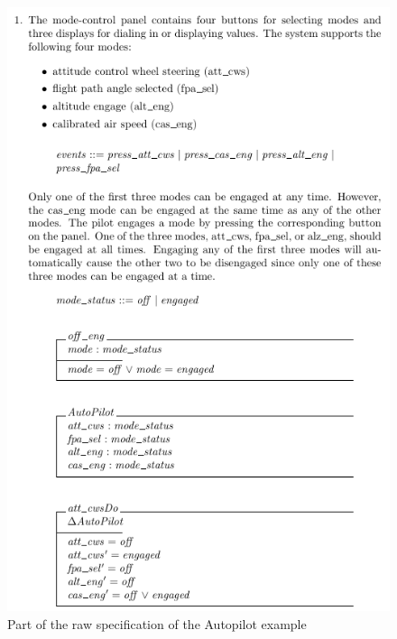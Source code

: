 \begin{figure}[H]
\begin{minipage}{0.45\textwidth}
    \includegraphics[width=\textwidth]{Figures/fullexample/0auto.png}
    \end{minipage}
    \caption{Part of the raw specification of the Autopilot example \label{fig:rawautocomp}}
    \end{figure}





